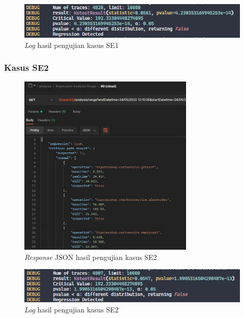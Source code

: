 \begin{figure}[!htb]
	\centering
	\includegraphics[width=1\textwidth]{resources/ch4/log/8-log.png}
	\caption{\textit{Log} hasil pengujian kasus SE1}
	\label{result_log_8}
\end{figure}
\pagebreak

\subsubsection{Kasus SE2}
\begin{figure}[!htb]
	\centering
	\includegraphics[width=0.75\textwidth]{resources/ch4/json/9.png}
	\caption{\textit{Response} JSON hasil pengujian kasus SE2}
	\label{result_json_9}
\end{figure}

\begin{figure}[!htb]
	\centering
	\includegraphics[width=1\textwidth]{resources/ch4/log/9-log.png}
	\caption{\textit{Log} hasil pengujian kasus SE2}
	\label{result_log_9}
\end{figure}
\pagebreak

